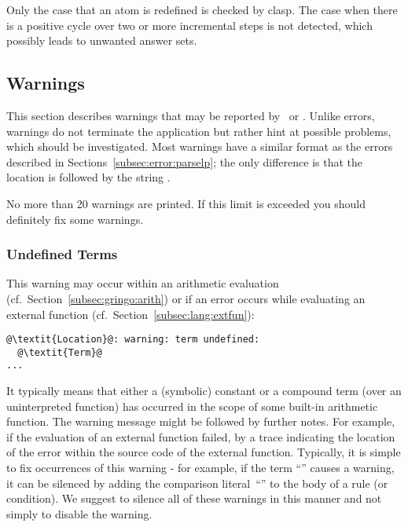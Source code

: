 \begin{note}
Only the case that an atom is redefined is checked by clasp.
The case when there is a positive cycle over two or more incremental steps is not detected,
which possibly leads to unwanted answer sets.
\end{note}

\subsection{Warnings}\label{subsec:warn}

This section describes warnings that may be reported by \gringo\ or \clingo.
Unlike errors, warnings do not terminate the application 
but rather hint at possible problems, which should be investigated.
Most warnings have a similar format as the errors described in Sections~\ref{subsec:error:parselp};
the only difference is that the location is followed by the string .

\begin{note}
No more than 20 warnings are printed.
If this limit is exceeded you should definitely fix some warnings.
\end{note}

\subsubsection{Undefined Terms}\label{sec:warn:undefterm}
This warning may occur within an arithmetic evaluation (cf.~Section~\ref{subsec:gringo:arith})
or if an error occurs while evaluating an external function (cf.~Section~\ref{subsec:lang:extfun}):
%
\begin{lstlisting}[numbers=none,escapechar=@]
@\textit{Location}@: warning: term undefined:
  @\textit{Term}@
...
\end{lstlisting}
%
It typically means that either a (symbolic) constant or a compound term (over an uninterpreted function)
has occurred in the scope of some built-in arithmetic function.
%
The warning message might be followed by further notes.
For example, if the evaluation of an external function failed,
by a trace indicating the location of the error within the source code of the external function.
%
Typically, it is simple to fix occurrences of this warning
- for example, if the term ``'' causes a warning,
it can be silenced by adding the comparison literal~``'' to the body of a rule (or condition).
We suggest to silence all of these warnings in this manner
and not simply to disable the warning.

